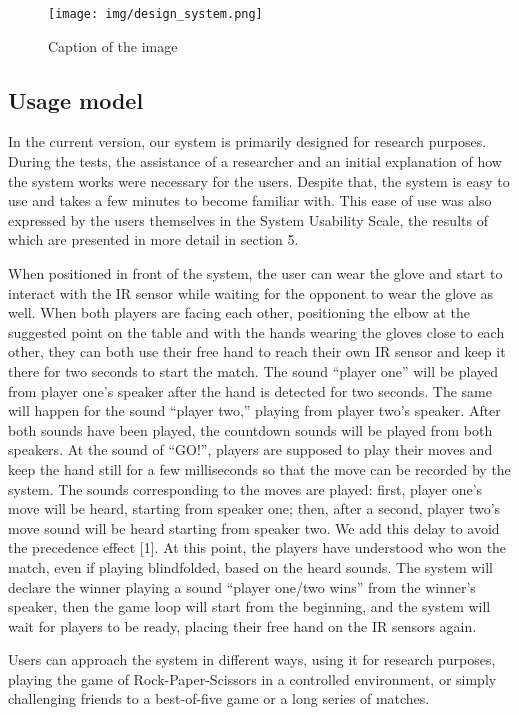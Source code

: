 \documentclass[11pt]{report}
\begin{document}
\begin{figure}[htbp]
  \centering
  \texttt{[image: img/design\_system.png]}
  \caption{Caption of the image}
  \label{fig:image_label}
\end{figure}
\subsection*{Usage model}
In the current version, our system is primarily designed for research purposes. During the tests, the assistance of a researcher and an initial explanation of how the system works were necessary for the users. Despite that, the system is easy to use and takes a few minutes to become familiar with. This ease of use was also expressed by the users themselves in the System Usability Scale, the results of which are presented in more detail in section 5.

When positioned in front of the system, the user can wear the glove and start to interact with the IR sensor while waiting for the opponent to wear the glove as well. When both players are facing each other, positioning the elbow at the suggested point on the table and with the hands wearing the gloves close to each other, they can both use their free hand to reach their own IR sensor and keep it there for two seconds to start the match. The sound “player one” will be played from player one’s speaker after the hand is detected for two seconds. The same will happen for the sound “player two,” playing from player two’s speaker. After both sounds have been played, the countdown sounds will be played from both speakers. At the sound of “GO!”, players are supposed to play their moves and keep the hand still for a few milliseconds so that the move can be recorded by the system. The sounds corresponding to the moves are played: first, player one’s move will be heard, starting from speaker one; then, after a second, player two’s move sound will be heard starting from speaker two. We add this delay to avoid the precedence effect [1]. At this point, the players have understood who won the match, even if playing blindfolded, based on the heard sounds. The system will declare the winner playing a sound “player one/two wins” from the winner’s speaker, then the game loop will start from the beginning, and the system will wait for players to be ready, placing their free hand on the IR sensors again.

Users can approach the system in different ways, using it for research purposes, playing the game of Rock-Paper-Scissors in a controlled environment, or simply challenging friends to a best-of-five game or a long series of matches.
\end{document}
